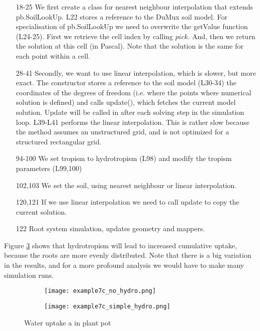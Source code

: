 \begin{itemize}
\item[18-25] We first create a class for nearest neighbour interpolation that extends pb.SoilLookUp. L22 stores a reference to the DuMux soil model. For specialisation of pb.SoilLookUp we need to overwrite the getValue function (L24-25). First we retrieve the cell index by calling $pick$. And, then we return the solution at this cell (in Pascal). Note that the solution is the same for each point within a cell. 
\item[28-41] Secondly, we want to use linear interpolation, which is slower, but more exact. The constructor stores a reference to the soil model (L30-34) the coordinates of the degrees of freedom (i.e. where the points where numerical solution is defined) and calls update(), which fetches the current model solution. Update will be called in after each solving step in the simulation loop. L39-L41 performs the linear interpolation. This is rather slow because the method assumes an unstructured grid, and is not optimized for a structured rectangular grid. 
\item[94-100] We set tropism to hydrotropism (L98) and modify the tropism parameters (L99,100)
\item[102,103] We set the soil, using nearest neighbour or linear interpolation.
\item[120,121] If we use linear interpolation we need to call update to copy the current solution. 
\item[122] Root system simulation, updates geometry and mappers.

\end{itemize}

Figure \ref{fig:example7c} shows that hydrotropism will lead to increased cumulative uptake, because the roots are more evenly distributed. Note that there is a big variation in the results, and for a more profound analysis we would have to make many simulation runs. 

\begin{figure}
\begin{subfigure}[c]{1\textwidth}
\texttt{[image: example7c\_no\_hydro.png]}
 \label{fig:example7c}
\end{subfigure}
\begin{subfigure}[c]{1\textwidth}
\texttt{[image: example7c\_simple\_hydro.png]}
 \label{fig:example7c_hydro}
\end{subfigure}
\caption{Water uptake a in plant pot} \label{fig:example7c}
\end{figure}

